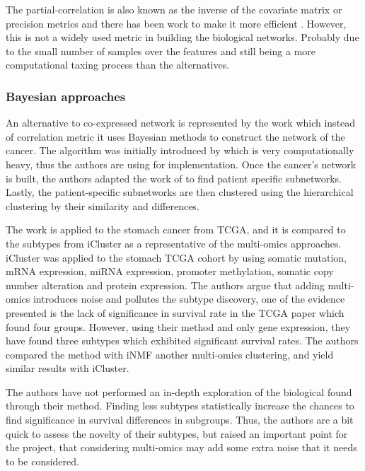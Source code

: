 The partial-correlation is also known as the inverse of the covariate matrix or precision metrics and there has been work to make it more efficient \citet{Ghanbari2019-tq}. However, this is not a widely used metric in building the biological networks. Probably due to the small number of samples over the features and still being a more computational taxing process than the alternatives.

\subsubsection{Bayesian approaches} \label{s:lit:bayesian}

An alternative to co-expressed network is represented by the work \citet{Nakazawa2021-yq} which instead of correlation metric it uses Bayesian methods to construct the network of the cancer. The algorithm was initially introduced by \citet{Imoto2001-uc} which is very computationally heavy, thus the authors are using \citet{Tamada2011-ok} for implementation. Once the cancer’s network is built, the authors adapted the work of \citet{Tanaka2020-mw} to find patient specific subnetworks. Lastly, the patient-specific subnetworks are then clustered using the hierarchical clustering by their similarity and differences.

The work is applied to the stomach cancer from TCGA, and it is compared to the subtypes from iCluster \citet{Shen2009-ew} as a representative of the multi-omics approaches. iCluster was applied to the stomach TCGA cohort by \citet{Cancer_Genome_Atlas_Research_Network2014-xp} using somatic mutation, mRNA expression, miRNA expression, promoter methylation, somatic copy number alteration and protein expression. The authors \citet{Nakazawa2021-yq} argue that adding multi-omics introduces noise and pollutes the subtype discovery, one of the evidence presented is the lack of significance in survival rate in the TCGA paper \citet{Cancer_Genome_Atlas_Research_Network2014-xp} which found four groups. However, using their method and only gene expression, they have found three subtypes which exhibited significant survival rates. The authors compared the method with iNMF \citet{Yang2016-dm} another multi-omics clustering, and yield similar results with iCluster.

The authors have not performed an in-depth exploration of the biological found through their method. Finding less subtypes statistically increase the chances to find significance in survival differences in subgroups. Thus, the authors are a bit quick to assess the novelty of their subtypes, but raised an important point for the project, that considering multi-omics may add some extra noise that it needs to be considered.

